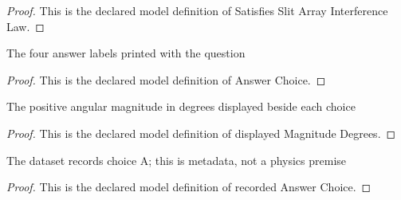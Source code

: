 \begin{proof}
  This is the declared model definition of Satisfies Slit Array Interference Law.
\end{proof}
\begin{definition}
  \label{def:physics:phyx-mini-0124:phyxminiproblems-problemphyxmini0124-answerchoice}
  The four answer labels printed with the question
\end{definition}
\begin{proof}
  This is the declared model definition of Answer Choice.
\end{proof}
\begin{definition}
  \label{def:physics:phyx-mini-0124:phyxminiproblems-problemphyxmini0124-answerchoice-displayedmagnitudedegrees}
  The positive angular magnitude in degrees displayed beside each choice
\end{definition}
\begin{proof}
  This is the declared model definition of displayed Magnitude Degrees.
\end{proof}
\begin{definition}
  \label{def:physics:phyx-mini-0124:phyxminiproblems-problemphyxmini0124-recordedanswerchoice}
  The dataset records choice A; this is metadata, not a physics premise
\end{definition}
\begin{proof}
  This is the declared model definition of recorded Answer Choice.
\end{proof}
